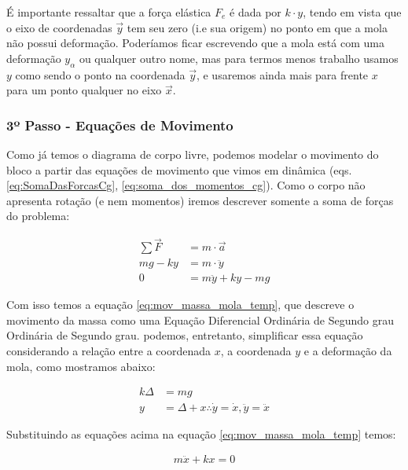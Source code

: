 \documentclass{article}
\newcommand{\n}{\nonumber \\ }
\begin{document}
                    É importante ressaltar que a força elástica $F_e$ é dada por $k\cdot y$, tendo em vista que o eixo de coordenadas $\vec y$ tem
                    seu zero (i.e sua origem) no ponto em que a mola não possui deformação. Poderíamos ficar escrevendo que a mola está com uma deformação $y_\alpha$ ou qualquer outro nome, mas para
                    termos menos trabalho usamos $y$ como sendo o ponto na coordenada $\vec y$, e usaremos ainda mais para frente $x$ para um ponto qualquer no eixo $\vec x$.

                \subsubsection*{3º Passo - Equações de Movimento}

                    Como já temos o diagrama de corpo livre, podemos modelar o movimento do bloco a partir das equações de movimento que vimos em dinâmica (eqs. \ref{eq:SomaDasForcasCg}, 
                    \ref{eq:soma_dos_momentos_cg}).
                    Como o corpo não apresenta rotação (e nem momentos) iremos descrever somente a soma de forças do problema:

                    \begin{align}
                        \sum \vec F &= m \cdot \vec a \n
                        mg - k y    &= m \cdot \ddot y \n
                        0 &= m \ddot y + ky - mg \label{eq:mov_massa_mola_temp}
                    \end{align}

                    Com isso temos a equação \ref{eq:mov_massa_mola_temp}, que descreve o movimento da massa como uma Equação Diferencial Ordinária de Segundo grau Ordinária de Segundo grau.
                    podemos, entretanto, simplificar essa equação considerando a relação entre a coordenada $x$, a coordenada $y$ e a deformação da mola, como mostramos abaixo: 

                    \begin{align}
                        k \Delta &= m g\\
                        y &= \Delta + x \therefore \dot y = \dot x, \ddot y = \ddot x
                    \end{align}

                    Substituindo as equações acima na equação \ref{eq:mov_massa_mola_temp} temos:

                    \begin{align}
                        m\ddot x + kx = 0
                    \end{align}
\end{document}
